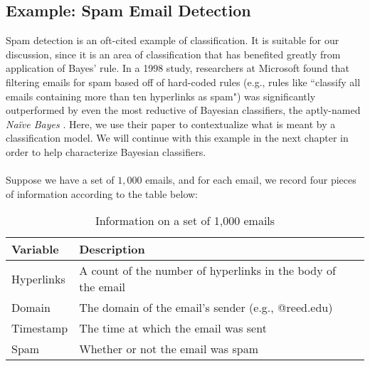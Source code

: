 
	\subsection*{Example: Spam Email Detection}
	Spam detection is an oft-cited example of classification. It is suitable for our discussion, since it is an area of classification that has benefited greatly from application of Bayes' rule. In a 1998 study, researchers at Microsoft found that filtering emails for spam based off of hard-coded rules (e.g., rules like ``classify all emails containing more than ten hyperlinks as spam") was significantly outperformed by even the most reductive of Bayesian classifiers, the aptly-named {\em Na\"{i}ve Bayes} \cite{msft}. Here, we use their paper to contextualize what is meant by a classification model. We will continue with this example in the next chapter in order to help characterize Bayesian classifiers. \\ \\
	
	Suppose we have a set of $1,000$ emails, and for each email, we record four pieces of information according to the table below:
	
	\begin{table}[htdp] %
\caption[Example Data for Classifications]{Information on a set of 1,000 emails} 
\begin{center}
\begin{tabular}{l | l l} 
 \toprule
  \textbf{Variable} & \textbf{Description} \\ %
  \midrule %
  Hyperlinks  & A count of the number of hyperlinks in the body of the email \\ %
  Domain & The domain of the email's sender (e.g., @reed.edu) \\
  Timestamp & The time at which the email was sent \\
  Spam & Whether or not the email was spam \\
\bottomrule %
\end{tabular}
\end{center}
\label{bvf} %
\end{table}


